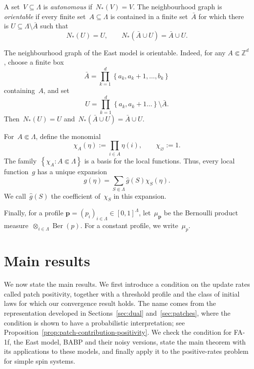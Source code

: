 \documentclass[EJP,preprint,NODS,nobera]{ejpecp}
\newcommand{\Z}{\mathbb{Z}}
\newcommand{\cb}[1]{\left\{#1\right\}}
\newcommand{\vn}{\varnothing}
\newcommand{\mb}[1]{\mathbf{#1}}
\begin{document}
\begin{definition}[Orientability]
A set~$V\subseteq\Lambda$ is \emph{autonomous} if~$N_*(V)=V$. The
neighbourhood graph is \emph{orientable} if every finite set~$A\subseteq\Lambda$
is contained in a finite set~$\bar A$ for which there is
$U\subseteq\Lambda\setminus\bar A$ such that
\begin{equation*}
N_*(U)=U,
\qquad
N_*(\bar A\cup U)=\bar A\cup U.
\end{equation*}
\end{definition}

\begin{example}
\label{ex:east-orientable}
The neighbourhood graph of the East model is orientable. Indeed, for any
$A\Subset\Z^d$, choose a finite box
\begin{equation*}
\bar A=\prod_{k=1}^d \cb{a_k, a_k +1,\dots,b_k}
\end{equation*}
containing~$A$, and set
\begin{equation*}
U=\prod_{k=1}^d \cb{a_k, a_k+1\dots} \setminus \bar{A}.
\end{equation*}
Then~$N_*(U)=U$ and~$N_*(\bar A\cup U)=\bar A\cup U$.
\end{example}

For~$A\Subset\Lambda$, define the monomial
\begin{equation*}
\chi_A(\eta)
:=
\prod_{i\in A}\eta(i),
\qquad
\chi_\vn:=1.
\end{equation*}
The family~$\cb{\chi_A:A\Subset \Lambda}$ is a basis for the local
functions. Thus, every local function~$g$ has a unique
expansion
\begin{equation}
\label{eq:rate-expansion-revision}
g(\eta)
=
\sum_{S\Subset \Lambda}
\widehat g(S)\chi_S(\eta).
\end{equation}
We call~$\widehat g(S)$ the coefficient of~$\chi_S$ in this expansion.

 Finally, for a profile
$\mb p=(p_i)_{i\in\Lambda}\in[0,1]^\Lambda$, let~$\mu_{\mb p}$ be the Bernoulli product measure~$\otimes_{i\in\Lambda}\operatorname{Ber}(p)$.
For a constant profile, we write~$\mu_p$.
\section{Main results}
\label{sec:main-results}

We now state the main results. We first introduce a condition on the update
rates called patch positivity, together with a threshold profile and the
class of initial laws for which our convergence result holds. The name comes
from the representation developed in Sections~\ref{sec:dual}
and~\ref{sec:patches}, where the condition is shown to have a probabilistic
interpretation; see Proposition~\ref{prop:patch-contribution-positivity}. We
check the condition for FA-1f, the East model, BABP and their noisy
versions, state the main theorem with its applications to these models, and
finally apply it to the positive-rates problem for simple spin systems.
\end{document}
